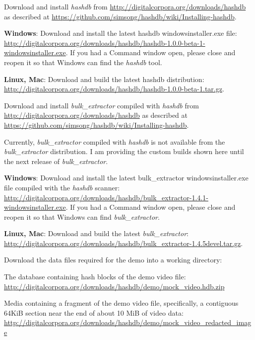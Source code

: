 \documentclass[12pt,twoside]{article}
\newcommand{\hdb}{\emph{hashdb}\xspace}
\newcommand{\bulk}{\emph{bulk\_extractor}\xspace}
\begin{document}
\begin{compactenum}
\item Download and install \hdb from
\url{http://digitalcorpora.org/downloads/hashdb}
as described at
\url{https://github.com/simsong/hashdb/wiki/Installing-hashdb}.
  \begin{compactitem}
  \item \textbf{Windows}: Download and install the latest hashdb windowsinstaller.exe file:
  \url{http://digitalcorpora.org/downloads/hashdb/hashdb-1.0.0-beta-1-windowsinstaller.exe}.
If you had a Command window open, please close and reopen it
so that Windows can find the \hdb tool.

  \item \textbf{Linux, Mac}: Download and build the latest hashdb distribution:
  \url{http://digitalcorpora.org/downloads/hashdb/hashdb-1.0.0-beta-1.tar.gz}.
  \end{compactitem}
\item Download and install \bulk compiled with \hdb from
\url{http://digitalcorpora.org/downloads/hashdb}
as described at
\url{https://github.com/simsong/hashdb/wiki/Installing-hashdb}.

Currently, \bulk compiled with \hdb
is not available from the \bulk distribution.
I am providing the custom builds shown here until the next release of \bulk.
  \begin{compactitem}
  \item \textbf{Windows}: Download and install the latest
  bulk\_extractor windowsinstaller.exe file
  compiled with the \hdb scanner:
  \url{http://digitalcorpora.org/downloads/hashdb/bulk\_extractor-1.4.1-windowsinstaller.exe}.
If you had a Command window open, please close and reopen it
so that Windows can find \bulk.
  \item \textbf{Linux, Mac}: Download and build the latest \bulk:
  \url{http://digitalcorpora.org/downloads/hashdb/bulk\_extractor-1.4.5devel.tar.gz}.
  \end{compactitem}

\item Download the data files required for the demo into a working directory:
  \begin{compactitem}
  \item The database containing hash blocks of the demo video file:
  \url{http://digitalcorpora.org/downloads/hashdb/demo/mock\_video.hdb.zip}
  \item Media containing a fragment of the demo video file,
  specifically, a contiguous 64KiB section
  near the end of about 10 MiB of video data:
  \url{http://digitalcorpora.org/downloads/hashdb/demo/mock\_video\_redacted\_image}
  \end{compactitem}


\end{compactenum}
\end{document}
